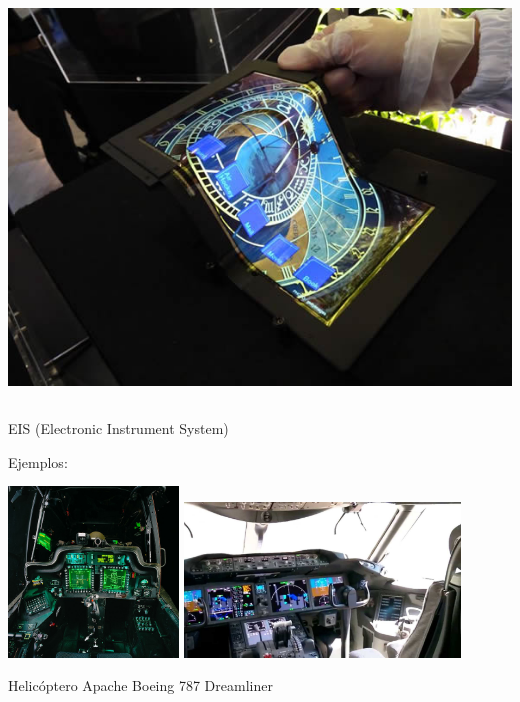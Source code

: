 \begin{frame}
\begin{columns}
\begin{column}{0.5\textwidth}
\vspace{3mm}

  \includegraphics[width=0.7\linewidth]{imagenes/1.4.pantalla.electronica/foldable-oled-display.jpg}
    \end{column}
  \end{columns}

\end{frame}

\begin{frame}

  \begin{block}{ EIS (Electronic Instrument
      System)}

Ejemplos:

\includegraphics[width=0.34\textwidth]{imagenes/1.4.pantalla.electronica/apache.jpg}
\hspace{3mm}
\includegraphics[width=0.55\textwidth]{imagenes/1.4.pantalla.electronica/dreamliner.jpg}

Helic\'optero Apache \hspace{25mm} Boeing 787 Dreamliner
  \end{block}

\end{frame}

